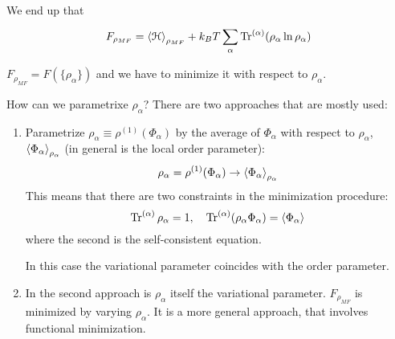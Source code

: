\documentclass[../main/main.tex]{subfiles}
\begin{document}
We end up that
\begin{equation}
  F_{\rho _{MF}} = \expval{\mathcal{H}}_{\rho _{MF}} + k_B T \sum_{\alpha }^{} \Tr^{(\alpha )}(\rho _ \alpha  \ln{\rho _ \alpha } )
\end{equation}
\begin{remark}
\( F_{\rho _{MF}} = F ( \{ \rho _ \alpha  \}  ) \)  and we have to minimize it with respect to \( \rho _ \alpha  \).
\end{remark}
How can we parametrixe \( \rho _ \alpha  \)?
There are two approaches that are mostly used:
\begin{enumerate}
\item Parametrize \( \rho _ \alpha \equiv \rho ^{(1)} (\Phi _ \alpha )\) by the average of \( \Phi _ \alpha  \) with respect to \( \rho _ \alpha  \), \( \expval{\Phi _ \alpha }_ { \rho _ \alpha }  \) (in general is the local order parameter):
\begin{equation*}
  \rho _ \alpha = \rho ^{(1)} ( \Phi _{\alpha })  \rightarrow  \expval{\Phi _ \alpha }_ {\rho _ \alpha }
\end{equation*}
This means that there are two constraints in the minimization procedure:
\begin{equation*}
  \Tr^{(\alpha )} \rho _ \alpha = 1, \quad  \Tr^{(\alpha )}(\rho _ \alpha \Phi _ \alpha ) = \expval{\Phi _ \alpha }
\end{equation*}
where the second is the self-consistent equation.
\begin{remark}
In this case the variational parameter coincides with the order parameter.
\end{remark}

\item In the second approach is \( \rho _ \alpha  \) itself the variational parameter.
\( F_{\rho _{MF}} \) is minimized by varying \( \rho _ \alpha  \). It is a more general approach, that involves functional minimization.
\end{enumerate}
\end{document}
